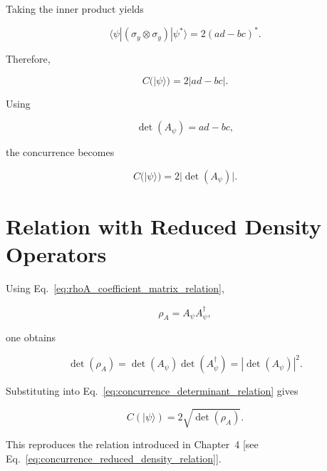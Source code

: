 Taking the inner product yields

\begin{equation}
\langle \psi |
(\sigma_y \otimes \sigma_y)
|\psi^*\rangle
=
2(ad-bc)^*.
\label{eq:spin_flip_inner_product}
\end{equation}

Therefore,

\begin{equation}
C(|\psi\rangle)
=
2|ad-bc|.
\label{eq:pure_state_concurrence_closed_form}
\end{equation}

Using

\begin{equation}
\det(A_\psi)=ad-bc,
\label{eq:coefficient_matrix_determinant}
\end{equation}

the concurrence becomes

\begin{equation}
C(|\psi\rangle)
=
2|\det(A_\psi)|.
\label{eq:concurrence_determinant_relation}
\end{equation}


\section*{Relation with Reduced Density Operators}

Using Eq.~\eqref{eq:rhoA_coefficient_matrix_relation},

\begin{equation}
\rho_A
=
A_\psi A_\psi^\dagger,
\end{equation}

one obtains

\begin{equation}
\det(\rho_A)
=
\det(A_\psi)
\det(A_\psi^\dagger)
=
|\det(A_\psi)|^2.
\label{eq:determinant_reduced_density_operator}
\end{equation}

\medskip
Substituting into Eq.~\eqref{eq:concurrence_determinant_relation} gives

\begin{equation}
C(|\psi\rangle)
=
2\sqrt{\det(\rho_A)}.
\end{equation}

This reproduces the relation introduced in Chapter~4 [see Eq.~\eqref{eq:concurrence_reduced_density_relation}].

